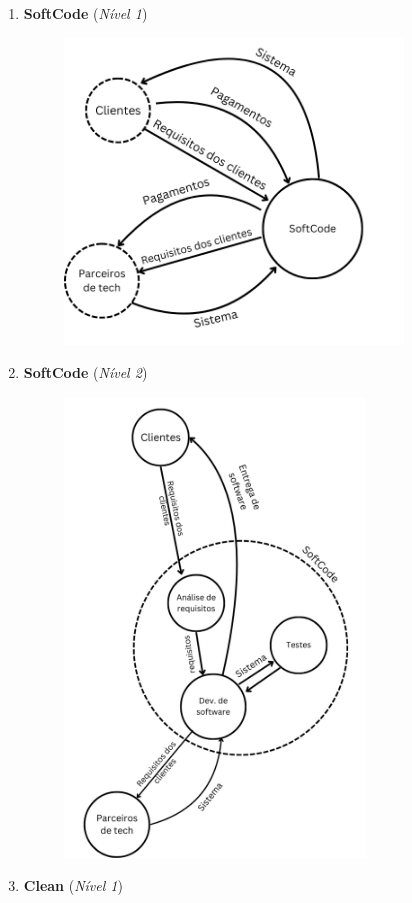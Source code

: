 \documentclass{article}
\begin{document}
\begin{enumerate}
\begin{figure}[!h]
    \end{figure}
    \item \textbf{SoftCode} (\textit{Nível 1})
    \begin{figure}[!h]
        \centering
        \includegraphics[width=9cm]{FIG/softcode1.png}
    \end{figure}
    \item \textbf{SoftCode} (\textit{Nível 2})
    \begin{figure}[!h]
        \centering
        \includegraphics[width=8cm]{FIG/softcode2.png}
    \end{figure}
    \item \textbf{Clean} (\textit{Nível 1})

\end{enumerate}
\end{document}
